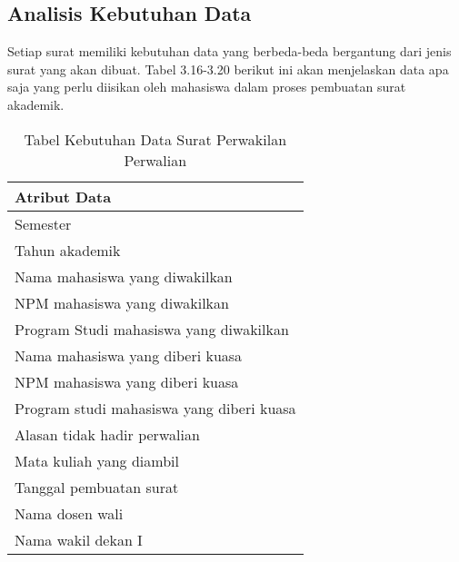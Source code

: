 \subsection{Analisis Kebutuhan Data}
\label{sec:analisis_kebutuhan_data}
Setiap surat memiliki kebutuhan data yang berbeda-beda bergantung dari jenis surat yang akan dibuat. Tabel 3.16-3.20 berikut ini akan menjelaskan data apa saja yang perlu diisikan oleh mahasiswa dalam proses pembuatan surat akademik.\
\begin{table}[H]
\centering
\caption{Tabel Kebutuhan Data Surat Perwakilan Perwalian}
\label{surat_perwakilan_perwalian}
\begin{tabular}{|l|}
\hline
\textbf{Atribut Data}                     \\ \hline
Semester            											\\ \hline
Tahun akademik								            \\ \hline
Nama mahasiswa yang diwakilkan            \\ \hline 
NPM mahasiswa yang diwakilkan             \\ \hline 
Program Studi mahasiswa yang diwakilkan   \\ \hline 
Nama mahasiswa yang diberi kuasa          \\ \hline 
NPM mahasiswa yang diberi kuasa           \\ \hline 
Program studi mahasiswa yang diberi kuasa \\ \hline 
Alasan tidak hadir perwalian               \\ \hline 
Mata kuliah yang diambil                  \\ \hline 
Tanggal pembuatan surat                   \\ \hline
Nama dosen wali								            \\ \hline
Nama wakil dekan I								        \\ \hline
\end{tabular}
\end{table}
\

